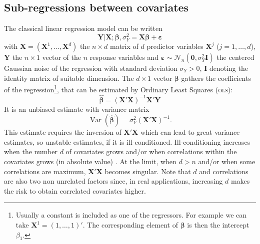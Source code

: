 \documentclass[11pt,a4paper]{article}
\begin{document}
\subsection{Sub-regressions between covariates}%
The classical linear regression model can be written
\begin{equation}
		\boldsymbol{Y}{|\boldsymbol{X}};\boldsymbol{\beta},\sigma_Y^2 = \boldsymbol{X}\boldsymbol{\beta} + \boldsymbol{\varepsilon} \label{regressionsimple}
	\end{equation}
with $\boldsymbol{X}=(\boldsymbol{X}^1,\ldots,\boldsymbol{X}^d)$ the $n\times d$ matrix of $d$ predictor variables $\boldsymbol{X}^j$ ($j=1,\ldots,d$), $\boldsymbol{Y}$ the $n\times 1$ vector of the $n$ response variables and $\boldsymbol{\varepsilon} \sim \mathcal{N}_n(\boldsymbol{0},\sigma_Y^2\boldsymbol{I})$ the centered Gaussian noise of the regression with standard deviation $\sigma_Y >0$, $\boldsymbol{I}$ denoting the identity matrix of suitable dimension. The $d\times 1$ vector $\boldsymbol{\beta}$ gathers the coefficients of the regression\footnote{Usually a constant is included as one of the regressors. For example we can take $\boldsymbol{X}^1=(1,\ldots,1)'$. The corresponding element of $\boldsymbol{\beta}$ is then the intercept $\beta_1$.}, that can be estimated by Ordinary Least Squares (\textsc{ols}): %
	\begin{equation}
		\hat{\boldsymbol{\beta}}=\left(\boldsymbol{X}'\boldsymbol{X} \right) ^{-1}\boldsymbol{X}'\boldsymbol{Y} \label{eq:OLS}
	\end{equation}
	It is an unbiased estimate with variance matrix
	\begin{equation}
		\operatorname{Var}(\hat{\boldsymbol{\beta}})=\sigma_Y^2\left(\boldsymbol{X}'\boldsymbol{X} \right) ^{-1}. \label{eq:varOLS}
	\end{equation}
	This estimate requires the inversion of $\boldsymbol{X}'\boldsymbol{X}$ which can lead to great variance estimates, so unstable estimates, if it is ill-conditioned. Ill-conditioning increases when the number $d$ of covariates grows and/or when correlations within the covariates grows (in absolute value)  \cite{hoerl1970ridge}. At the limit, when $d>n$ and/or when some correlations are maximum, $\boldsymbol{X}'\boldsymbol{X}$ becomes singular. Note that $d$ and correlations are also two non unrelated factors since, in real applications, increasing $d$ makes the risk to obtain correlated covariates higher.
	
\vspace{3mm}
\end{document}
